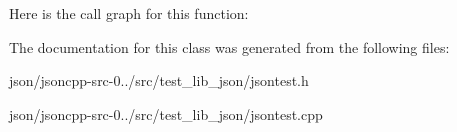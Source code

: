 Here is the call graph for this function\+:




The documentation for this class was generated from the following files\+:\begin{DoxyCompactItemize}
\item 
json/jsoncpp-\/src-\/0../src/test\+\_\+lib\+\_\+json/jsontest.\+h\item 
json/jsoncpp-\/src-\/0../src/test\+\_\+lib\+\_\+json/jsontest.\+cpp\end{DoxyCompactItemize}
